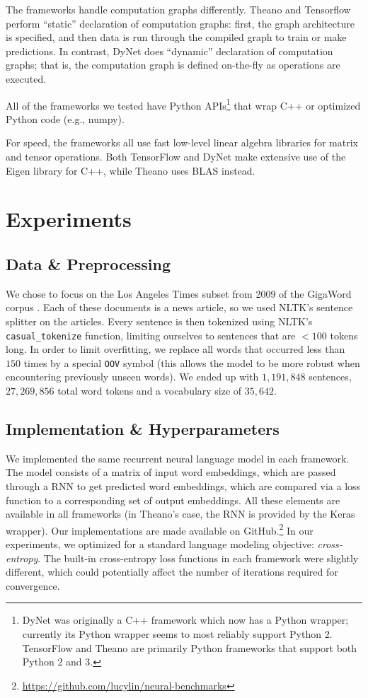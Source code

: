 \documentclass{article}
\begin{document}
The frameworks handle computation graphs differently. Theano and Tensorflow perform ``static'' declaration of computation graphs: first, the graph architecture is specified, and then data is run through the compiled graph to train or make predictions. In contrast, DyNet does ``dynamic'' declaration of computation graphs; that is, the computation graph is defined on-the-fly as operations are executed.

All of the frameworks we tested have Python APIs\footnote{DyNet was originally a C++ framework which now has a Python wrapper; currently its Python wrapper seems to most reliably support Python 2. TensorFlow and Theano are primarily Python frameworks that support both Python 2 and 3.} that wrap C++ or optimized Python code (e.g., numpy).

For speed, the frameworks all use fast low-level linear algebra libraries for matrix and tensor operations. Both TensorFlow and DyNet make extensive use of the Eigen library for C++, while Theano uses BLAS instead.


\section{Experiments}
\subsection{Data \& Preprocessing}
We chose to focus on the Los Angeles Times subset from 2009 of the GigaWord corpus \cite{gigaword}. Each of these documents is a news article, so we used NLTK’s \cite{nltk} sentence splitter on the articles. Every sentence is then tokenized using NLTK’s \verb!casual_tokenize! function, limiting ourselves to sentences that are $<100$ tokens long. In order to limit overfitting, we replace all words that occurred less than $150$ times by a special \verb!OOV! symbol (this allows the model to be more robust when encountering previously unseen words). We ended up with $1,191,848$ sentences, $27,269,856$ total word tokens and a vocabulary size of $35,642$.

\subsection{Implementation \& Hyperparameters}
We implemented the same recurrent neural language model in each framework. The model consists of a matrix of input word embeddings, which are passed through a RNN to get predicted word embeddings, which are compared via a loss function to a corresponding set of output embeddings. All these elements are available in all frameworks (in Theano's case, the RNN is provided by the Keras wrapper). Our implementations are made available on GitHub.\footnote{\url{https://github.com/lucylin/neural-benchmarks}}
In our experiments, we optimized for a standard language modeling objective: \textit{cross-entropy}. The built-in cross-entropy loss functions in each framework were slightly different, which could potentially affect the number of iterations required for convergence.
\end{document}

